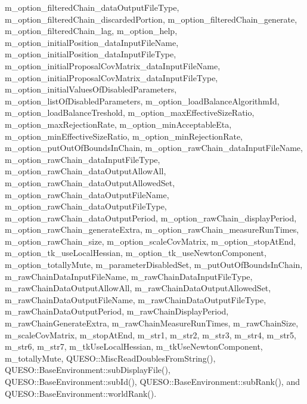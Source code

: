 m\-\_\-option\-\_\-filtered\-Chain\-\_\-data\-Output\-File\-Type, m\-\_\-option\-\_\-filtered\-Chain\-\_\-discarded\-Portion, m\-\_\-option\-\_\-filtered\-Chain\-\_\-generate, m\-\_\-option\-\_\-filtered\-Chain\-\_\-lag, m\-\_\-option\-\_\-help, m\-\_\-option\-\_\-initial\-Position\-\_\-data\-Input\-File\-Name, m\-\_\-option\-\_\-initial\-Position\-\_\-data\-Input\-File\-Type, m\-\_\-option\-\_\-initial\-Proposal\-Cov\-Matrix\-\_\-data\-Input\-File\-Name, m\-\_\-option\-\_\-initial\-Proposal\-Cov\-Matrix\-\_\-data\-Input\-File\-Type, m\-\_\-option\-\_\-initial\-Values\-Of\-Disabled\-Parameters, m\-\_\-option\-\_\-list\-Of\-Disabled\-Parameters, m\-\_\-option\-\_\-load\-Balance\-Algorithm\-Id, m\-\_\-option\-\_\-load\-Balance\-Treshold, m\-\_\-option\-\_\-max\-Effective\-Size\-Ratio, m\-\_\-option\-\_\-max\-Rejection\-Rate, m\-\_\-option\-\_\-min\-Acceptable\-Eta, m\-\_\-option\-\_\-min\-Effective\-Size\-Ratio, m\-\_\-option\-\_\-min\-Rejection\-Rate, m\-\_\-option\-\_\-put\-Out\-Of\-Bounds\-In\-Chain, m\-\_\-option\-\_\-raw\-Chain\-\_\-data\-Input\-File\-Name, m\-\_\-option\-\_\-raw\-Chain\-\_\-data\-Input\-File\-Type, m\-\_\-option\-\_\-raw\-Chain\-\_\-data\-Output\-Allow\-All, m\-\_\-option\-\_\-raw\-Chain\-\_\-data\-Output\-Allowed\-Set, m\-\_\-option\-\_\-raw\-Chain\-\_\-data\-Output\-File\-Name, m\-\_\-option\-\_\-raw\-Chain\-\_\-data\-Output\-File\-Type, m\-\_\-option\-\_\-raw\-Chain\-\_\-data\-Output\-Period, m\-\_\-option\-\_\-raw\-Chain\-\_\-display\-Period, m\-\_\-option\-\_\-raw\-Chain\-\_\-generate\-Extra, m\-\_\-option\-\_\-raw\-Chain\-\_\-measure\-Run\-Times, m\-\_\-option\-\_\-raw\-Chain\-\_\-size, m\-\_\-option\-\_\-scale\-Cov\-Matrix, m\-\_\-option\-\_\-stop\-At\-End, m\-\_\-option\-\_\-tk\-\_\-use\-Local\-Hessian, m\-\_\-option\-\_\-tk\-\_\-use\-Newton\-Component, m\-\_\-option\-\_\-totally\-Mute, m\-\_\-parameter\-Disabled\-Set, m\-\_\-put\-Out\-Of\-Bounds\-In\-Chain, m\-\_\-raw\-Chain\-Data\-Input\-File\-Name, m\-\_\-raw\-Chain\-Data\-Input\-File\-Type, m\-\_\-raw\-Chain\-Data\-Output\-Allow\-All, m\-\_\-raw\-Chain\-Data\-Output\-Allowed\-Set, m\-\_\-raw\-Chain\-Data\-Output\-File\-Name, m\-\_\-raw\-Chain\-Data\-Output\-File\-Type, m\-\_\-raw\-Chain\-Data\-Output\-Period, m\-\_\-raw\-Chain\-Display\-Period, m\-\_\-raw\-Chain\-Generate\-Extra, m\-\_\-raw\-Chain\-Measure\-Run\-Times, m\-\_\-raw\-Chain\-Size, m\-\_\-scale\-Cov\-Matrix, m\-\_\-stop\-At\-End, m\-\_\-str1, m\-\_\-str2, m\-\_\-str3, m\-\_\-str4, m\-\_\-str5, m\-\_\-str6, m\-\_\-str7, m\-\_\-tk\-Use\-Local\-Hessian, m\-\_\-tk\-Use\-Newton\-Component, m\-\_\-totally\-Mute, Q\-U\-E\-S\-O\-::\-Misc\-Read\-Doubles\-From\-String(), Q\-U\-E\-S\-O\-::\-Base\-Environment\-::sub\-Display\-File(), Q\-U\-E\-S\-O\-::\-Base\-Environment\-::sub\-Id(), Q\-U\-E\-S\-O\-::\-Base\-Environment\-::sub\-Rank(), and Q\-U\-E\-S\-O\-::\-Base\-Environment\-::world\-Rank().



